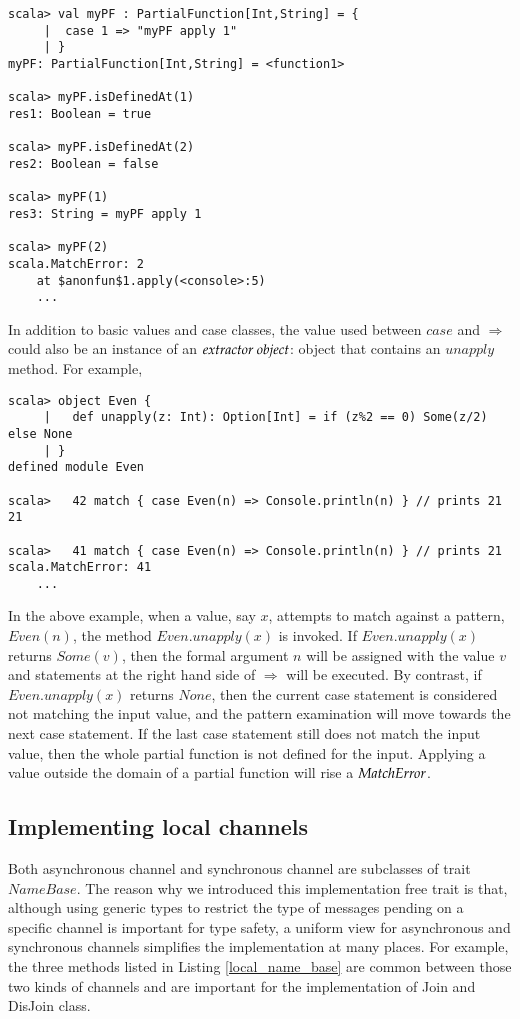 \begin{lstlisting}
scala> val myPF : PartialFunction[Int,String] = {
     |  case 1 => "myPF apply 1"
     | }
myPF: PartialFunction[Int,String] = <function1>

scala> myPF.isDefinedAt(1)
res1: Boolean = true

scala> myPF.isDefinedAt(2)
res2: Boolean = false

scala> myPF(1)            
res3: String = myPF apply 1

scala> myPF(2)            
scala.MatchError: 2
	at $anonfun$1.apply(<console>:5)
	...
\end{lstlisting}

In addition to basic values and case classes, the value used between $case$ and $\Rightarrow$ could also be an instance of an $\it{extractor\ object}$: object that contains an $unapply$ method\cite{extractors}.  For example,

\begin{lstlisting}
scala> object Even {
     |   def unapply(z: Int): Option[Int] = if (z%2 == 0) Some(z/2) else None
     | }
defined module Even

scala>   42 match { case Even(n) => Console.println(n) } // prints 21
21

scala>   41 match { case Even(n) => Console.println(n) } // prints 21
scala.MatchError: 41
	...
\end{lstlisting}

In the above example, when a value, say $x$, attempts to match against a pattern, $Even(n)$, the method $Even.unapply(x)$ is invoked.  If $Even.unapply(x)$ returns $Some(v)$, then the formal argument $n$ will be assigned with the value $v$ and statements at the right hand side of $\Rightarrow$ will be executed.  By contrast, if $Even.unapply(x)$ returns $None$, then the current case statement is considered not matching the input value, and the pattern examination will move towards the next case statement.  If the last case statement still does not match the input value, then the whole partial function is not defined for the input.  Applying a value outside the domain of a partial function will rise a $\it{MatchError}$.

\subsection{Implementing local channels}
\label{imp_loc_join}
Both asynchronous channel and synchronous channel are subclasses of trait $NameBase$.  The reason why we introduced this implementation free trait is that, although using generic types to restrict the type of messages pending on a specific channel is important for type safety, a uniform view for asynchronous and synchronous channels simplifies the implementation at many places.  For example, the three methods listed in Listing \ref{local_name_base} are common between those two kinds of channels and are important for the implementation of Join and DisJoin class.

